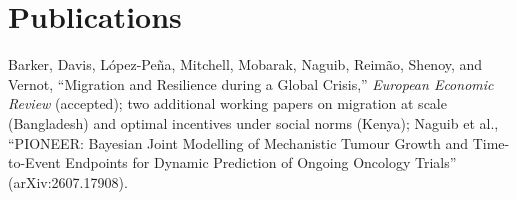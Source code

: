 \documentclass[11pt]{article}
\begin{document}
\section*{Publications}

Barker, Davis, L\'opez-Pe\~na, Mitchell, Mobarak, Naguib, Reim\~ao, Shenoy, and Vernot,
``Migration and Resilience during a Global Crisis,'' \textit{European Economic Review} (accepted);
two additional working papers on migration at scale (Bangladesh) and optimal incentives under social norms (Kenya);
Naguib et al., ``PIONEER: Bayesian Joint Modelling of Mechanistic Tumour Growth and Time-to-Event Endpoints
for Dynamic Prediction of Ongoing Oncology Trials'' (arXiv:2607.17908).
\end{document}

